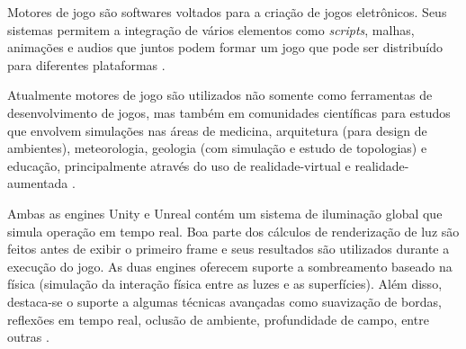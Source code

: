 Motores de jogo são softwares voltados para a criação de jogos eletrônicos. Seus sistemas permitem a integração de vários elementos como \textit{\Gls{scripts}}, malhas, animações e audios que juntos podem formar um jogo que pode ser distribuído para diferentes plataformas \cite{compStudyGE}. 

Atualmente motores de jogo são utilizados não somente como ferramentas de desenvolvimento de jogos, mas também em comunidades científicas para estudos que envolvem simulações nas áreas de medicina, arquitetura (para design de ambientes), meteorologia, geologia (com simulação e estudo de topologias) e educação, principalmente através do uso de \Gls{realidade-virtual} e \Gls{realidade-aumentada} \cite{comparacaoDesempenho2}. 

\begin{quadro}[h!]	
	\centering
\end{quadro}
\hfill

Ambas as engines Unity e Unreal contém um sistema de iluminação global que simula operação em tempo real. Boa parte dos cálculos de renderização de luz são feitos antes de exibir o primeiro frame e seus resultados são utilizados durante a execução do jogo. As duas engines oferecem suporte a sombreamento baseado na física (simulação da interação física entre as luzes e as superfícies). Além disso, destaca-se o suporte a algumas técnicas avançadas como suavização de bordas, reflexões em tempo real, oclusão de ambiente, profundidade de campo, entre outras \cite{compStudyGE}. 

